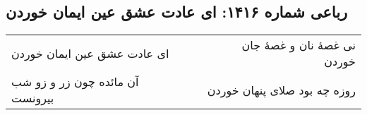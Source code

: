 \begin{center}
\section*{رباعی شماره ۱۴۱۶: ای عادت عشق عین ایمان خوردن}
\label{sec:1416}
\begin{longtable}{l p{0.5cm} r}
ای عادت عشق عین ایمان خوردن
&&
نی غصهٔ نان و غصهٔ جان خوردن
\\
آن مائده چون زر و زو شب بیرونست
&&
روزه چه بود صلای پنهان خوردن
\\
\end{longtable}
\end{center}
